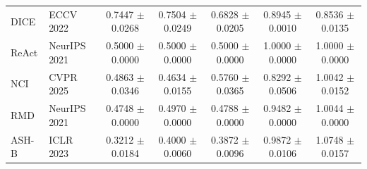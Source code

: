 \begin{table}[t]
{\begin{tabular}{llccccc}
DICE & ECCV 2022 & 0.7447 $\pm$ 0.0268 & 0.7504 $\pm$ 0.0249 & 0.6828 $\pm$ 0.0205 & 0.8945 $\pm$ 0.0010 & 0.8536 $\pm$ 0.0135 \\
ReAct & NeurIPS 2021 & 0.5000 $\pm$ 0.0000 & 0.5000 $\pm$ 0.0000 & 0.5000 $\pm$ 0.0000 & 1.0000 $\pm$ 0.0000 & 1.0000 $\pm$ 0.0000 \\
NCI & CVPR 2025 & 0.4863 $\pm$ 0.0346 & 0.4634 $\pm$ 0.0155 & 0.5760 $\pm$ 0.0365 & 0.8292 $\pm$ 0.0506 & 1.0042 $\pm$ 0.0152 \\
RMD & NeurIPS 2021 & 0.4748 $\pm$ 0.0000 & 0.4970 $\pm$ 0.0000 & 0.4788 $\pm$ 0.0000 & 0.9482 $\pm$ 0.0000 & 1.0044 $\pm$ 0.0000 \\
ASH-B & ICLR 2023 & 0.3212 $\pm$ 0.0184 & 0.4000 $\pm$ 0.0060 & 0.3872 $\pm$ 0.0096 & 0.9872 $\pm$ 0.0106 & 1.0748 $\pm$ 0.0157 \\
\bottomrule
\end{tabular}%
}
\end{table}

